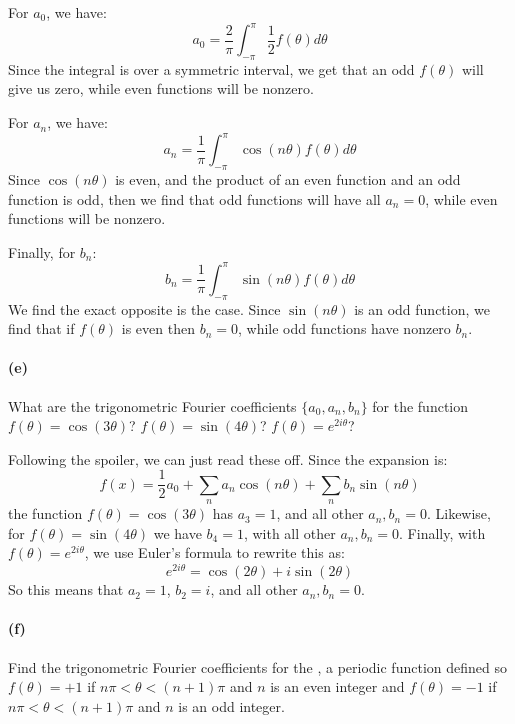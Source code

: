 \documentclass{article}
\begin{document}
\begin{solution}
	For $a_0$, we have:
	\[
		a_0 = \frac{2}{\pi}\int_{-\pi}^\pi \frac{1}{2}f(\theta) d\theta 
	\] 
	Since the integral is over a symmetric interval, we get that an odd $f(\theta)$
	will give us zero, while even functions will be nonzero. 

	For $a_n$, we have:
	\[
		a_n = \frac{1}{\pi}\int_{-\pi}^\pi \cos(n \theta) f(\theta) d\theta 
	\] 
	Since $\cos(n \theta)$ is even, and the product of an even function and an odd function is odd, then we 
	find that odd functions will have all $a_n = 0$, while even functions will be nonzero. 

	Finally, for $b_n$:
	\[
		b_n = \frac{1}{\pi}\int_{-\pi}^\pi \sin(n \theta) f(\theta) d\theta 
	\] 
	We find the exact opposite is the case. Since $\sin(n\theta)$ is an odd function, we find that if $f(\theta)$
	is even then $b_n = 0$, while odd functions have nonzero $b_n$. 
\end{solution}

\paragraph{(e)}
What are the trigonometric Fourier coefficients $\{a_{0},a_{n},b_{n}\}$ for the function $f(\theta) = \cos(3\theta)$?  $f(\theta) = \sin(4\theta)$?  $f(\theta) = e^{2i\theta}$?

\begin{solution}
	Following the spoiler, we can just read these off. Since the expansion is:
	\[
	f(x) = \frac{1}{2}a_0 + \sum_n a_n \cos(n \theta) + \sum_n b_n \sin(n \theta)
	\] 
	the function $f(\theta) = \cos(3 \theta)$ has $a_3 = 1$, and all other $a_n, b_n = 0$. Likewise, for 
	$f(\theta) = \sin(4 \theta)$ we have $b_4 = 1$, with all other $a_n, b_n = 0$. Finally, with $f(\theta) = 
	e^{2 i \theta}$, we use Euler's formula to rewrite this as:
	\[
		e^{2 i \theta} = \cos(2\theta) + i \sin(2 \theta)
	\] 
	So this means that $a_2 = 1$, $b_2 = i$, and all other $a_n, b_n = 0$.
\end{solution}

\paragraph{(f)}
Find the trigonometric Fourier coefficients for the , a periodic function defined so $f(\theta) = +1$ if $n\pi < \theta < (n+1)\pi$ and $n$ is an even integer and
$f(\theta) = -1$ if $n\pi < \theta < (n+1)\pi$ and $n$ is an odd integer.
\end{document}
